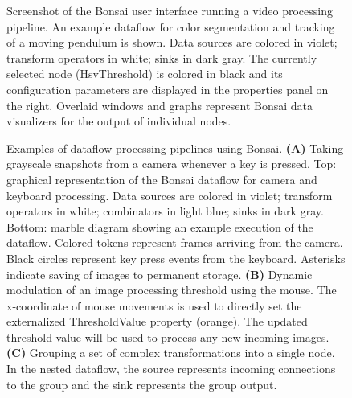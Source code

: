 \begin{figure}
\begin{center}
\end{center}
\vspace{-5mm}
\caption{Screenshot of the Bonsai user interface running a video processing pipeline. An example dataflow for color segmentation and tracking of a moving pendulum is shown. Data sources are colored in violet; transform operators in white; sinks in dark gray. The currently selected node (HsvThreshold) is colored in black and its configuration parameters are displayed in the properties panel on the right. Overlaid windows and graphs represent Bonsai data visualizers for the output of individual nodes.}
\label{fig:bonsaiInterface}
\end{figure}

\begin{figure}
\begin{center}
\scalebox{0.5}{}
\end{center}
\vspace{-5mm}
\caption{Examples of dataflow processing pipelines using Bonsai. \textbf{(A)} Taking grayscale snapshots from a camera whenever a key is pressed. Top: graphical representation of the Bonsai dataflow for camera and keyboard processing. Data sources are colored in violet; transform operators in white; combinators in light blue; sinks in dark gray. Bottom: marble diagram showing an example execution of the dataflow. Colored tokens represent frames arriving from the camera. Black circles represent key press events from the keyboard. Asterisks indicate saving of images to permanent storage. \textbf{(B)} Dynamic modulation of an image processing threshold using the mouse. The x-coordinate of mouse movements is used to directly set the externalized ThresholdValue property (orange). The updated threshold value will be used to process any new incoming images. \textbf{(C)} Grouping a set of complex transformations into a single node. In the nested dataflow, the source represents incoming connections to the group and the sink represents the group output.}
\label{fig:bonsaiExamples}
\end{figure}

